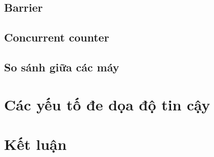 \subsection{Barrier}

\subsection{Concurrent counter}

\subsection{So sánh giữa các máy}


\section{Các yếu tố đe dọa độ tin cậy}


\section{Kết luận}


\nocite{*}



\clearpage
\appendix

